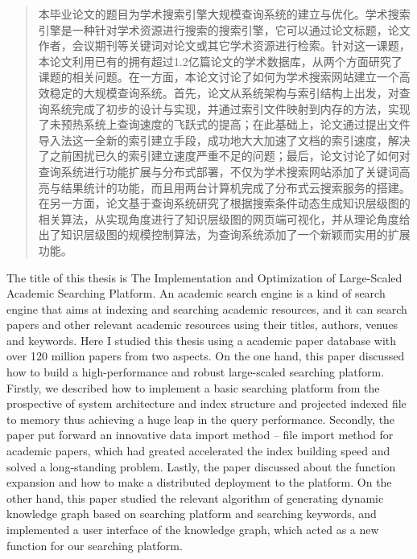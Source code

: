 
\begin{abstract}

\large 本毕业论文的题目为学术搜索引擎大规模查询系统的建立与优化。学术搜索引擎是一种针对学术资源进行搜索的搜索引擎，它可以通过论文标题，论文作者，会议期刊等关键词对论文或其它学术资源进行检索。针对这一课题，本论文利用已有的拥有超过1.2亿篇论文的学术数据库，从两个方面研究了课题的相关问题。在一方面，本论文讨论了如何为学术搜索网站建立一个高效稳定的大规模查询系统。首先，论文从系统架构与索引结构上出发，对查询系统完成了初步的设计与实现，并通过索引文件映射到内存的方法，实现了未预热系统上查询速度的飞跃式的提高；在此基础上，论文通过提出文件导入法这一全新的索引建立手段，成功地大大加速了文档的索引速度，解决了之前困扰已久的索引建立速度严重不足的问题；最后，论文讨论了如何对查询系统进行功能扩展与分布式部署，不仅为学术搜索网站添加了关键词高亮与结果统计的功能，而且用两台计算机完成了分布式云搜索服务的搭建。在另一方面，论文基于查询系统研究了根据搜索条件动态生成知识层级图的相关算法，从实现角度进行了知识层级图的网页端可视化，并从理论角度给出了知识层级图的规模控制算法，为查询系统添加了一个新颖而实用的扩展功能。

\end{abstract}

\begin{englishabstract}

The title of this thesis is The Implementation and Optimization of Large-Scaled Academic Searching Platform. An academic search engine is a kind of search engine that aims at indexing and searching academic resources, and it can search papers and other relevant academic resources using their titles, authors, venues and keywords. Here I studied this thesis using a academic paper database with over 120 million papers from two aspects. On the one hand, this paper discussed how to build a high-performance and robust large-scaled searching platform. Firstly, we described how to implement a basic searching platform from the prospective of system architecture and index structure and projected indexed file to memory thus achieving a huge leap in the query performance. Secondly, the paper put forward an innovative data import method -- file import method for academic papers, which had greated accelerated the index building speed and solved a long-standing problem. Lastly, the paper discussed about the function expansion and how to make a distributed deployment to the platform. On the other hand, this paper studied the relevant algorithm of generating dynamic knowledge graph based on searching platform and searching keywords, and implemented a user interface of the knowledge graph, which acted as a new function for our searching platform.

\end{englishabstract}

